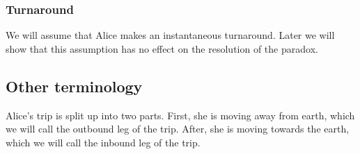 			\subsubsection{Turnaround}
				We will assume that Alice makes an instantaneous turnaround.
				Later we will show that this assumption has no effect on the resolution of the paradox.
		\subsection{Other terminology}
			Alice's trip is split up into two parts.
			First, she is moving away from earth, which we will call the outbound leg of the trip.
			After, she is moving towards the earth, which we will call the inbound leg of the trip.
